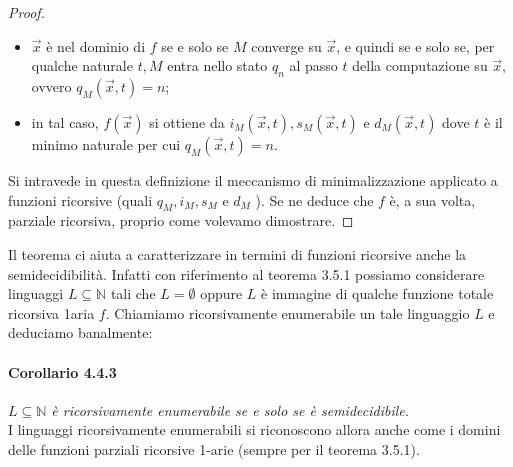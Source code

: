 \begin{proof}
    \begin{itemize}
        \item $\vec{x}$ è nel dominio di $f$ se e solo se $M$ converge su $\vec{x}$, e quindi
              se e solo se, per qualche naturale $t, M$ entra nello stato $q_n$ al passo $t$
              della computazione su $\vec{x}$, ovvero $q_M(\vec{x}, t)=n$;
        \item in tal caso,
              $f(\vec{x})$ si ottiene da $i_M(\vec{x}, t), s_M(\vec{x}, t)$ e $d_M(\vec{x},
                  t)$ dove $t$ è il minimo naturale per cui $q_M(\vec{x}, t)=n$.
    \end{itemize}


    Si intravede in questa definizione il meccanismo di minimalizzazione applicato a
    funzioni ricorsive (quali $q_M, i_M, s_M$ e $d_M$ ). Se ne deduce che $f$ è, a
    sua volta, parziale ricorsiva, proprio come volevamo dimostrare.

\end{proof}

Il teorema ci aiuta a caratterizzare in termini di funzioni ricorsive anche la
semidecidibilità. Infatti con riferimento al teorema 3.5.1 possiamo considerare
linguaggi $L \subseteq \mathbb{N}$ tali che $L=\emptyset$ oppure $L$ è immagine
di qualche funzione totale ricorsiva 1aria $f$. Chiamiamo ricorsivamente
enumerabile un tale linguaggio $L$ e deduciamo banalmente:

\paragraph{Corollario 4.4.3} \textit{$L \subseteq \mathbb{N}$ è ricorsivamente enumerabile se
    e solo se è semidecidibile.}\\

I linguaggi ricorsivamente enumerabili si riconoscono allora anche come i domini
delle funzioni parziali ricorsive 1-arie (sempre per il teorema 3.5.1).
